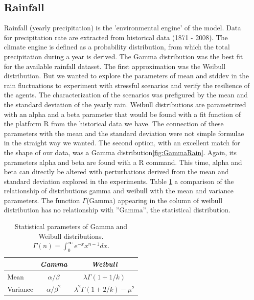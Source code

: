 \documentclass[11pt,oneside,a4paper,openright]{report}
\begin{document}
\subsection{Rainfall}

Rainfall (yearly precipitation) is the 'environmental engine' of the model. Data for precipitation rate are
extracted from historical data (1871 - 2008). The climate engine is defined as a probability distribution,
from which the total precipitation during a year is derived. The Gamma distribution was the best fit for
the available rainfall dataset. The first approximation was the Weibull distribution. But we wanted to explore
the parameters of mean and stddev in the rain fluctuations to experiment with stressful scenarios and verify
the resilience of the agents. The characterization of the scenarios was prefigured by the mean and the 
standard deviation of the yearly rain. Weibull distributions are parametrized with an alpha and a beta 
parameter that would be found with a fit function of the platform R from the historical data we have. The connection
of these parameters with the mean and the standard deviation were not simple formulae in the straight way we wanted. 
The second option, with an excellent match for the shape of our data, was a Gamma distribution\ref{fig:GammaRain}. Again, its parameters alpha and beta are found with a R command. This time, alpha and beta can directly be altered with perturbations derived from the mean and standard deviation explored in the experiments. Table \ref{tab:GammaVSWeibull} a comparison of the relationship of distributions gamma and weibull with the mean and variance parameters.
The function $\Gamma$(Gamma) appearing in the column of weibull distribution has no relationship with ''Gamma'', the statistical distribution. 


	\begin{table}[h]
	\centering
	\begin{tabular}{|l|c||c|}
		\hline
		--		&\emph{Gamma} 		& \emph{Weibull}\\
		\hline
		Mean		&$\alpha/\beta$		& $\lambda\Gamma(1+1/k)$ \\
		\hline
		Variance	&$\alpha/\beta^2$	& $\lambda^2\Gamma(1+2/k)-\mu^2$ \\
		\hline
	\end{tabular}
	\caption{Statistical parameters of Gamma and Weibull distributions.
		$\Gamma(n) = \int^{\infty}_{0} e^{-x}x^{n-1}dx$.    }
	\label{tab:GammaVSWeibull}
	\end{table}
\end{document}

